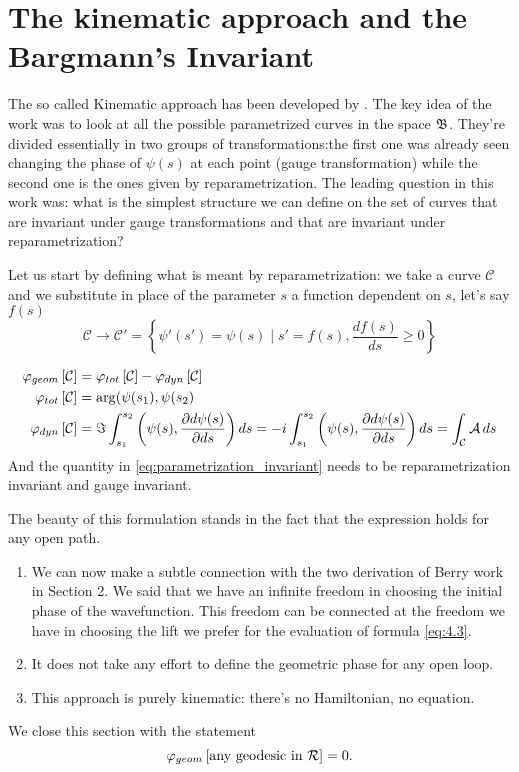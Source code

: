 \chapter{The kinematic approach and the Bargmann's Invariant}
The so called Kinematic approach has been developed by \cite{mukunda1993quantum}. The key idea of the work was to look at all the possible parametrized curves in the space $ \B $. They're divided essentially in two groups of transformations:the first one was already seen changing the phase of $ \psi(s) $ at each point (gauge transformation) while the second one is the ones given by reparametrization. The leading question in this work was: what is the simplest structure we can define on the set of curves that are invariant under gauge transformations and that are invariant under reparametrization?

Let us start by defining what is meant by reparametrization: we take a curve $ \mathcal{C} $ and we substitute in place of the parameter $ s $ a function dependent on $ s $, let's say $ f(s) $
\begin{equation}
\mathcal{C}\to\mathcal{C}'=\left\{\psi'(s')=\psi(s)\mid s'=f(s),\frac{df(s)}{ds}\geq 0 \right\}
\end{equation}

\begin{align}
	\phi_{geom}\left[\mathcal{C} \right]&=\phi_{tot}\left[ \mathcal{C}\right]-\phi_{dyn}\left[\mathcal{C}\right]\label{eq:parametrization_invariant}\\
	\phi_{tot}\left[\mathcal{C}\right]&=\arg(\psi(s_1),\psi(s_2)\label{eq:4.3}\\
	\phi_{dyn}\left[\mathcal{C}\right]&=\Im\int_{s_1}^{s_2}\left(\psi(s),\pd{d\psi(s)}{ds}\right)\diff s=-i\int_{s_1}^{s_2}\left(\psi(s),\pd{d\psi(s)}{ds}\right)\diff s=\int_{\mathcal{C}}\mathcal{A}\diff s
\end{align}
And the quantity in \eqref{eq:parametrization_invariant} needs to be reparametrization invariant and gauge invariant.

The beauty of this formulation stands in the fact that the expression holds for any open path.
\begin{enumerate}
	\item We can now make a subtle connection with the two derivation of Berry work in Section 2. We said that we have an infinite freedom in choosing the initial phase of the wavefunction. This freedom can be connected at the freedom we have in choosing the lift we prefer for the evaluation of formula \eqref{eq:4.3}.
	\item It does not take any effort to define the geometric phase for any open loop.
	\item This approach is purely kinematic: there's no Hamiltonian, no \Sch equation. 
\end{enumerate}
We close this section with the statement
\begin{equation}
\phi_{geom}\left[\text{any geodesic in $ \mathcal{R} $} \right]=0.
\end{equation}
